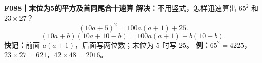 \textbf{F088｜末位为5的平方及首同尾合十速算}
\textbf{解决：}不用竖式，怎样迅速算出 $65^2$ 和 $23\times27$？
\[\boxed{(10a+5)^2=100a(a+1)+25}.\]
\[\boxed{(10a+b)(10a+10-b)=100a(a+1)+b(10-b)}.\]
\textbf{快记：}前面 $a(a+1)$，后面写两位数；末位为 $5$ 时写 $25$。
\textbf{例：}$65^2=4225$，$23\times27=621$，$42\times48=2016$。
